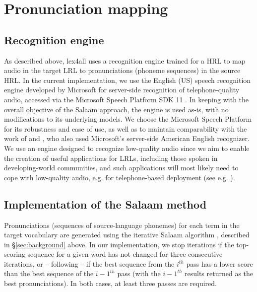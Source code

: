 \documentclass[11pt]{article}
\begin{document}
\section{Pronunciation mapping}
\label{sec:backend}

\subsection{Recognition engine}
\label{sec:engine}
As described above, lex4all uses a recognition engine trained for a HRL to map audio in the target LRL to pronunciations (phoneme sequences) in the source HRL. 
In the current implementation, we use the English (US) speech recognition engine developed by Microsoft for server-side recognition of telephone-quality audio, accessed via the Microsoft Speech Platform SDK 11 \cite{mspsdk}. 
In keeping with the overall objective of the Salaam approach, the engine is used as-is, with no modifications to its underlying models. 
We choose the Microsoft Speech Platform for its robustness and ease of use, as well as to maintain comparability with the work of  and , who also used Microsoft's server-side American English recognizer. 
We use an engine designed to recognize low-quality audio since we aim to enable the creation of useful applications for LRLs, including those spoken in developing-world communities, and such applications will most likely need to cope with low-quality audio, e.g. for telephone-based deployment (see e.g. ).



\subsection{Implementation of the Salaam method}
\label{sec:implementation}

Pronunciations (sequences of source-language phonemes) for each term in the target vocabulary are generated using the iterative Salaam algorithm \cite[\S4.1]{Qiao10}, described in \S\ref{sec:background} above. In our implementation, 
we stop iterations
if the top-scoring sequence for a given word has not changed for three consecutive iterations, or -- following  --  if the best sequence from the $i^{th}$ pass has a lower score than the best sequence of the ${i - 1}^{th}$ pass (with the ${i - 1}^{th}$ results returned as the best pronunciations). In both cases, at least three passes are required. 
\end{document}
